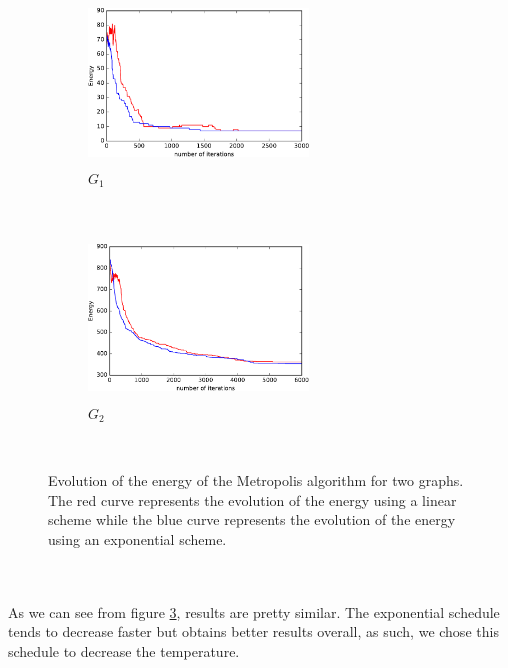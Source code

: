\documentclass[a4paper]{article}
\begin{document}
\begin{figure}[h!]
    \centering
    \begin{subfigure}[b]{0.45\textwidth}
        \includegraphics[width=2.3in, height = 1.7in]{H_G1_cropped.pdf}
        \caption{$G_1$}
        \label{fig:g1}
    \end{subfigure}
    ~ %
    \begin{subfigure}[b]{0.45\textwidth}
        \includegraphics[width=2.3in, height=1.7in]{H_G2_cropped.pdf}
        \caption{$G_2$}
        \label{fig:g2}
    \end{subfigure}
    ~ %
    \caption{Evolution of the energy of the Metropolis algorithm for two graphs. The red curve represents the evolution of the energy using a linear scheme while the blue curve represents the evolution of the energy using an exponential scheme.}
    \label{fig:comparison}
\end{figure}
\\\\
As we can see from figure \ref{fig:comparison}, results are pretty similar. The exponential schedule tends to decrease faster but obtains better results overall, as such, we chose this schedule to decrease the temperature.
\end{document}
